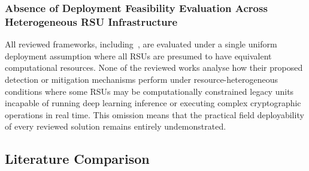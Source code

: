 \documentclass[12pt, a4paper]{report}
\begin{document}
\subsubsection{Absence of Deployment Feasibility Evaluation Across Heterogeneous RSU Infrastructure}
\label{subsec:heterogeneous-rsu}

All reviewed frameworks, including~\cite{raja2021, ghaleb2014,
hong2015, yahiatene2018towards}, are evaluated under a single
uniform deployment assumption where all RSUs are presumed to have equivalent
computational resources. None of the reviewed works analyse how their
proposed detection or mitigation mechanisms perform under resource-heterogeneous
conditions where some RSUs may be computationally constrained legacy units
incapable of running deep learning inference or executing complex cryptographic
operations in real time. This omission means that the practical field
deployability of every reviewed solution remains entirely undemonstrated.

\newpage

\subsection{Literature Comparison}
\label{sec:literature-comparison}
\end{document}
